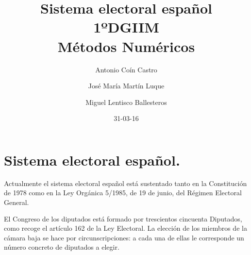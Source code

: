 \documentclass[11pt]{article}
\begin{document}
	\title{
		Sistema electoral español\\
		\vspace*{1\baselineskip}
		\large 1ºDGIIM \\
		Métodos Numéricos 
		\vspace*{1\baselineskip}
	} 
	
	\date{31-03-16}
	\author{Antonio Coín Castro \and José María Martín Luque \and Miguel Lentisco Ballesteros}
	
	
	
	\vfill
	
	\thispagestyle{empty}
	\newpage
	
	\fontsize{11}{14}
	
	\section{Sistema electoral español.}
	
	Actualmente el sistema electoral español está sustentado tanto en la Constitución de 1978 como en la Ley Orgánica 5/1985, de 19 de junio, del Régimen Electoral General.
	
	El Congreso de los diputados está formado por trescientos cincuenta Diputados, como recoge el artículo 162 de la Ley Electoral. La elección de los miembros de la cámara baja se hace por circunscripciones: a cada una de ellas le corresponde un número concreto de diputados a elegir.
	
\end{document}
